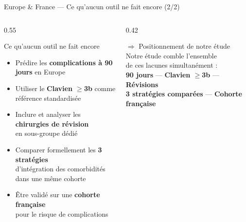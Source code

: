 \documentclass[aspectratio=169]{beamer}
\newcommand{\tightlist}{%
  \setlength{\itemsep}{1pt}\setlength{\parskip}{0pt}%
  \setlength{\parsep}{0pt}\setlength{\topsep}{2pt}}
\begin{document}
\begin{frame}{Europe \& France --- Ce qu'aucun outil ne fait encore (2/2)}
  \begin{columns}[T]
    \begin{column}{0.55\textwidth}
      \begin{exampleblock}{Ce qu'aucun outil ne fait encore}
        \footnotesize\tightlist
        \begin{itemize}\tightlist
          \item Prédire les \textbf{complications à 90 jours} en Europe
          \item Utiliser le \textbf{Clavien $\geq$3b} comme référence standardisée
          \item Inclure et analyser les \textbf{chirurgies de révision}\\
                en sous-groupe dédié
          \item Comparer formellement les \textbf{3 stratégies}\\
                d'intégration des comorbidités dans une même cohorte
          \item Être validé sur une \textbf{cohorte française}\\
                pour le risque de complications
        \end{itemize}
      \end{exampleblock}
    \end{column}
    \begin{column}{0.42\textwidth}
      \begin{block}{$\Rightarrow$ Positionnement de notre étude}
        \footnotesize
        Notre étude comble l'ensemble\\
        de ces lacunes simultanément :\\[6pt]
        \textcolor{vertdoux}{\textbf{90 jours}} ---
        \textcolor{vertdoux}{\textbf{Clavien $\geq$3b}} ---
        \textcolor{vertdoux}{\textbf{Révisions}}\\[4pt]
        \textcolor{vertdoux}{\textbf{3 stratégies comparées}} ---
        \textcolor{vertdoux}{\textbf{Cohorte française}}
      \end{block}
    \end{column}
  \end{columns}
\end{frame}
\end{document}
